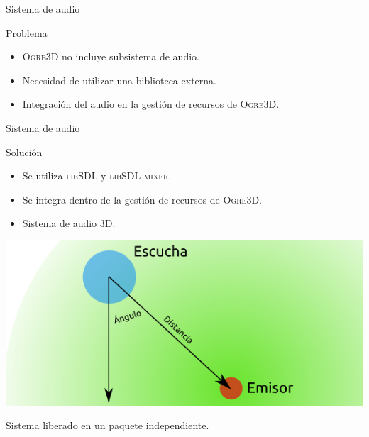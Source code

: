 \documentclass[green]{beamer}
\begin{document}

\begin{frame}{Sistema de audio}
    
    \begin{alertblock}{Problema}
	\begin{itemize}
	    \item \textsc{Ogre3D} no incluye subsistema de audio.
	    \item Necesidad de utilizar una biblioteca externa.
	    \item Integración del audio en la gestión de recursos de \textsc{Ogre3D}.
	\end{itemize}
    \end{alertblock}
\end{frame}

\begin{frame}{Sistema de audio}
    
    \begin{block}{Solución}
	\begin{itemize}
	    \item Se utiliza \textsc{libSDL} y \textsc{libSDL mixer}.
	    \item Se integra dentro de la gestión de recursos de \textsc{Ogre3D}.
	    \item Sistema de audio 3D.
	\end{itemize}
    \end{block}
    
    \begin{center}
	\includegraphics[scale=1]{img/audio3d-esquema.png}
    \end{center}
    
    Sistema liberado en un paquete independiente.
    
\end{frame}

    
\end{document}
